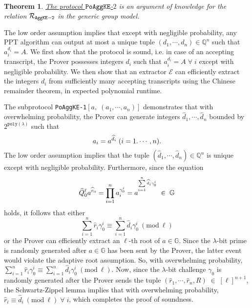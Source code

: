 \documentclass[11pt, lettersize, notitlepage, leqno, footskip=0.6cm]{article}
\newcommand{\bq}{\mathbb Q}
\newcommand{\pl}{\prod\limits}
\newcommand{\slim}{\sum\limits}
\newcommand{\ttt}{\texttt}
\newcommand{\bG}{\mathbb{G}}
\newcommand{\mc}{\mathcal}
\newcommand{\lam}{\lambda}
\newcommand{\what}{\widehat}
\newcommand{\vs}{\vspace{-0.15cm}}
\newcommand{\op}{overwhelming probability}
\newcommand{\np}{negligible probability}
\newcommand{\Mod}[1]{\ (\mathrm{mod}\ #1)}
\newcommand{\E}{\mc{E}}
\newtheorem{Thm}{Theorem}[section]
\numberwithin{equation}{section}
\begin{document}
\vspace{0.2cm}

\begin{Thm} \hyperlink{AggKE-2}{The protocol $\tt{PoAggKE}$-$2$} is an argument of knowledge for the relation $\mc{R}_{{\tt{AggKE-2}}}$ in the generic group model.\end{Thm}

\begin{prf} The low order assumption implies that except with \np, any PPT algorithm can output at most a unique tuple $(d_1,\cdots,d_n)\in\bq^n$ such that $a_i^{d_i} = A$. We first show that the protocol is sound, i.e. in case of an accepting transcript, the Prover possesses integers $d_i$ such that $a_i^{d_i} = A\;\forall\; i$ except with \np. We then show that an extractor $\E$ can efficiently extract the integers $d_i$ from sufficiently many accepting transcripts using the Chinese remainder theorem, in expected polynomial runtime.

The subprotocol \verb|PoAggKE-1|$[a,\;(a_1,\cdots,a_n)]$ demonstrates that with \op, the Prover can generate integers $\what{d}_1,\cdots,\what{d}_n$ bounded by $2^{\ttt{poly}(\lam)}$ such that \vs $$a_i = a^{\what{d}_i}\; (i=1.\cdots,n). \vs $$ The low order assumption implies that the tuple $(\what{d}_1,\cdots,\what{d}_n)\in\bq^n$ is unique except with \np. Furthermore, since the equation \vs $$\what{Q}_0^{\ell}a^{\what{r}_0} = \pl_{i=1}^{n} a_i^{\gamma_{0}^i}  = a^{^{\slim_{i=1}^n \what{d}_i\gamma_{0}^i}}\;\in\;\bG \vs $$ holds, it follows that either \vs $$\slim_{i=1}^n\what{r}_i\gamma_{0}^i\equiv \slim_{i=1}^n \what{d}_i\gamma_{0}^i\Mod{\ell}$$ or the Prover can efficiently extract an $\ell$-th root of $a\in\bG$. Since the $\lam$-bit prime is randomly generated after $a\in\bG$ has been sent by the Prover, the latter event would violate the adaptive root assumption. So, with \op, $\slim_{i=1}^n\what{r}_i\gamma_{0}^i\equiv \slim_{i=1}^n \what{d}_i\gamma_{0}^i\Mod{\ell}.$ Now, since the $\lam$-bit challenge $\gamma_{0}$ is randomly generated after the Prover sends the tuple $(\what{r}_1,\cdots,\what{r}_n, R)\;\in\;[\ell]^{n+1}$, the Schwartz-Zippel lemma implies that with \op, $\what{r}_i\equiv \what{d}_i\Mod{\ell}\;\forall\; i$, which completes the proof of soundness.


\end{prf}
\end{document}
